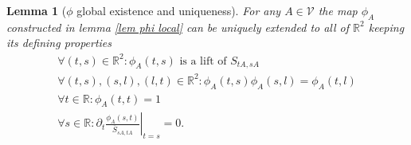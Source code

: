 \documentclass[b5paper,draft,openbib,12pt]{memoir}
\newtheorem{Lemma}[Def]{Lemma}
\begin{document}
\begin{Lemma}[\(\phi\) global existence and uniqueness]\label{lem: phi global}
For any \(A\in\mathcal{V}\) the map \(\phi_A\) constructed in 
lemma \ref{lem phi local} 
can  be uniquely extended to all of \(\mathbb{R}^2\)
keeping its defining properties 
\begin{align}\label{global phi prop1}
\forall (t,s)\in \mathbb{R}^2: \phi_A(t,s) \text{ is a lift of } S_{tA, sA}\\\label{global phi prop2}
\forall (t,s),(s,l),(l,t)\in \mathbb{R}^2: \phi_A(t,s)\phi_A(s,l)=\phi_A(t,l)\\\label{global phi prop3}
\forall t\in\mathbb{R}: \phi_A(t,t)=1\\\label{global phi prop4}
\forall s\in\mathbb{R}: \partial_{t} \left.\frac{\phi_A(s,t)}{\overline{S}_{sA,tA}}\right|_{t=s}=0.
\end{align}
\end{Lemma}
\end{document}
